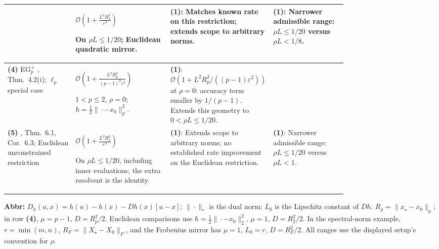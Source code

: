 \begin{table}[tp]
\begin{threeparttable}
\begin{tabularx}{\linewidth}{@{}>{\raggedright\arraybackslash}p{0.20\linewidth}>{\raggedright\arraybackslash}p{0.29\linewidth}>{\raggedright\arraybackslash}p{0.29\linewidth}>{\raggedright\arraybackslash}X@{}}
& $\mathcal{O}\!\left(1+\frac{L^2R_2^2}{\varepsilon^2}\right)$\par On $\rho L\le1/20$; Euclidean quadratic mirror.
& \textbf{(1)}: Matches known rate on this restriction; extends scope to arbitrary norms.
& \textbf{(1)}: Narrower admissible range: $\rho L\le1/20$ versus $\rho L<1/8$. \\
\midrule
\textbf{(4)} EG$_p^+$ \citep{newmDDJ2021v2}, Thm.~4.2(i); $\ell_p$ special case
& $\mathcal{O}\!\left(1+\frac{L^2R_p^2}{(p-1)^2\varepsilon^2}\right)$\par $1<p\le2$, $\rho=0$; $h=\frac12\|\cdot-x_0\|_p^2$.
& \textbf{(1)}: $\mathcal{O}(1+L^2R_p^2/((p-1)\varepsilon^2))$ at $\rho=0$: accuracy term smaller by $1/(p-1)$. Extends this geometry to $0<\rho L\le1/20$.
& \\
\midrule
\textbf{(5)} \citep{newmPethick2025}, Thm.~6.1, Cor.~6.3; Euclidean unconstrained restriction
& $\mathcal{O}\!\left(1+\frac{L^2R_2^2}{\varepsilon^2}\right)$\par On $\rho L\le1/20$, including inner evaluations; the extra resolvent is the identity.
& \textbf{(1)}: Extends scope to arbitrary norms; no established rate improvement on the Euclidean restriction.
& \textbf{(1)}: Narrower admissible range: $\rho L\le1/20$ versus $\rho L<1$. \\
\bottomrule
\end{tabularx}
\begin{tablenotes}[flushleft]\footnotesize
\item[] \textbf{Abbr:} $D_h(u,x)=h(u)-h(x)-Dh(x)[u-x]$; $\|\cdot\|_*$ is the dual norm; $L_0$ is the Lipschitz constant of $Dh$. $R_p=\|x_\star-x_0\|_p$; in row \textbf{(4)}, $\mu=p-1$, $D=R_p^2/2$. Euclidean comparisons use $h=\frac12\|\cdot-x_0\|_2^2$, $\mu=1$, $D=R_2^2/2$. In the spectral-norm example, $r=\min(m,n)$, $R_F=\|X_\star-X_0\|_F$, and the Frobenius mirror has $\mu=1$, $L_0=r$, $D=R_F^2/2$. All ranges use the displayed setup's convention for $\rho$.
\end{tablenotes}
\end{threeparttable}
\end{table}
\clearpage
